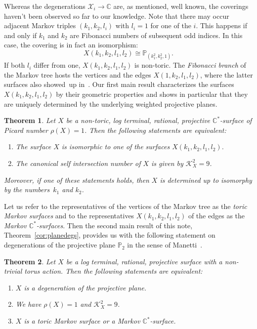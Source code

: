 \documentclass[pdftex]{sigma}
\newtheorem{thm}{Theorem}[section]
\theoremstyle{definition}
\def\CC{{\mathbb C}}
\def\PP{{\mathbb P}}
\begin{document}
Whereas the degenerations $\mathcal{X}_i \to \CC$
are, as mentioned, well known, the coverings haven't
been observed so far to our knowledge.
Note that there may occur adjacent Markov triples
$(k_1,k_2,l_i)$ with $l_i=1$ for one of the $i$.
This happens if and only if $k_1$ and $k_2$ are
Fibonacci numbers of subsequent odd indices.
In this case, the covering is in fact an isomorphism:
\[
X(k_1,k_2,l_1,l_2) \cong \PP_{(k_1^2,k_2^2,1)}.
\]
If both $l_i$ differ from one, $X(k_1,k_2,l_1,l_2)$
is non-toric.
The \emph{Fibonacci branch} of the Markov tree
hosts the vertices \smash{$\PP_{(1,k_2^2,l^2)}$}
and the edges $X(1,k_2,l_1,l_2)$, where the latter
surfaces also showed~up in~\cite[Remark~6.6]{LiXuZh}.
Our first main result characterizes the surfaces
$X(k_1,k_2,l_1,l_2)$ by their geometric
properties and shows in particular that they
are uniquely determined by the underlying weighted
projective planes.


\begin{thm}
Let $X$ be a non-toric, log terminal,
rational, projective $\CC^*$-surface of Picard
number $\rho(X) = 1$.
Then the following statements are equivalent:
\begin{enumerate}\itemsep=0pt
\item[$(i)$]
The surface $X$ is isomorphic to one of the
surfaces $X(k_1,k_2,l_1,l_2)$.
\item[$(ii)$]
The canonical self intersection number of $X$
is given by $\mathcal{K}_X^2 = 9$.
\end{enumerate}
Moreover, if one of these statements holds, then $X$ is
determined up to isomorphy by the numbers~$k_1$ and $k_2$.
\end{thm}


Let us refer to the representatives \smash{$\PP_{(k_1^2,k_2^2,l_i^2)}$}
of the vertices of the Markov tree as the
\emph{toric Markov surfaces}
and to the representatives $X(k_1,k_2,l_1,l_2)$
of the edges as the \emph{Markov $\CC^*$-surfaces}.
Then the second main result of this note,
Theorem~\ref{cor:planedegs}, provides
us with the following statement on degenerations
of the projective plane $\PP_2$ in the sense of
Manetti~\cite[Definition~1]{Ma}.

\goodbreak

\begin{thm}
Let $X$ be a log terminal,
rational, projective surface
with a non-trivial torus action.
Then the following statements are equivalent:
\begin{enumerate}\itemsep=0pt
\item[$(i)$]
$X$ is a degeneration of the projective
plane.
\item[$(ii)$]
We have $\rho(X) = 1$ and $\mathcal{K}_X^2 = 9$.
\item[$(iii)$]
$X$ is a toric Markov surface or a
Markov $\CC^*$-surface.
\end{enumerate}
\end{thm}
\end{document}
